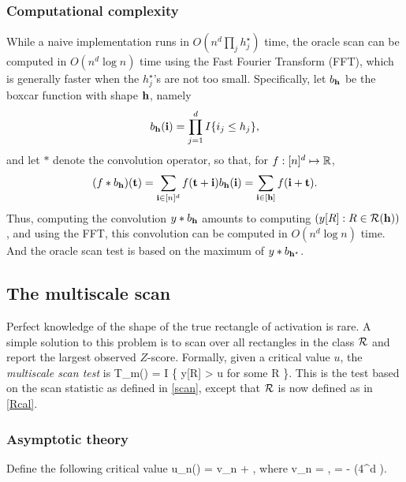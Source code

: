 \documentclass[twoside,11pt]{article}
\begin{document}
\subsubsection{Computational complexity} \label{sec:comp_o}
While a naive implementation runs in $O(n^d \prod_j h_j^\star)$ time, the oracle scan can be computed in $O(n^d \log n)$ time using the Fast Fourier Transform (FFT), which is generally faster when the $h_j^\star$'s are not too small.
Specifically, let $b_{\mathbf{h}}$ be the boxcar function with shape $\mathbf{h}$, namely
\[
b_{\mathbf{h}}(\mathbf{i}) = \prod_{j = 1}^d I\{i_j \le h_j\},
\]
and let $\ast$ denote the convolution operator, so that, for $f : [n]^d \mapsto \mathbb{R}$,
\[
(f \ast b_{\mathbf{h}}) (\mathbf{t}) = \sum_{\mathbf{i} \in [n]^d} f(\mathbf{t} + \mathbf{i}) b_{\mathbf{h}}(\mathbf{i}) = \sum_{\mathbf{i} \in [\mathbf{h}]} f(\mathbf{i} + \mathbf{t}).
\]
Thus, computing the convolution $y \ast b_{\mathbf{h}}$ amounts to computing $(y[R] : R \in \mathcal{R}(\mathbf{h}))$, and using the FFT, this convolution can be computed in $O(n^d \log n)$ time.
And the oracle scan test is based on the maximum of $y \ast b_{\mathbf{h}^\star}$.




\subsection{The multiscale scan}

Perfect knowledge of the shape of the true rectangle of activation is rare. A simple solution to this problem is to scan over all rectangles in the class $\mathcal{R}$ and report the largest observed $Z$-score.
Formally, given a critical value $u$, the {\em multiscale scan test} is  
\beq \label{scan_m}
T_m(\yb) = I \big\{ y[R] > u \textrm{ for some } R \in \Rcal \big\}.
\eeq
This is the test based on the scan statistic as defined in \eqref{scan}, except that $\mathcal{R}$ is now defined as in \eqref{Rcal}.

\subsubsection{Asymptotic theory}
Define the following critical value 
\beq \label{u_m}
u_n(\tau) = v_n + ,
\eeq
where 
\beq \label{v_m}
v_n = , \quad \kappa = - \log (4^d \sqrt {2 \pi}).
\eeq
\end{document}
